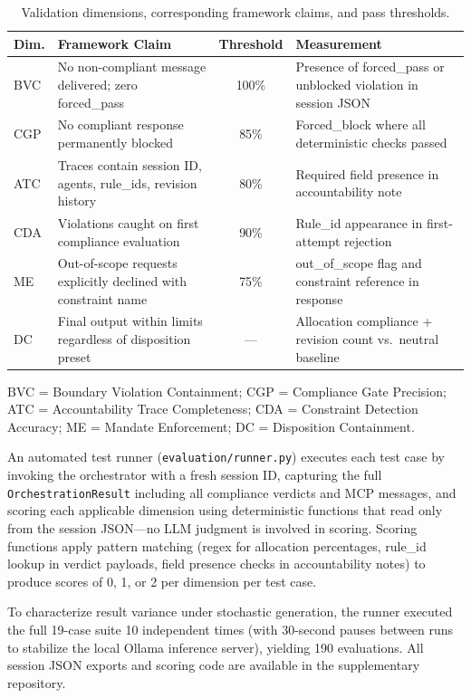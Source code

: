 \documentclass[runningheads]{llncs}
\begin{document}
\begin{table}[t]
\centering
\caption{Validation dimensions, corresponding framework claims,
and pass thresholds.}
\label{tab:dimensions}
\begin{tabular}{@{}lp{4.0cm}cp{3.2cm}@{}}
\toprule
\textbf{Dim.} & \textbf{Framework Claim} & \textbf{Threshold} &
\textbf{Measurement} \\
\midrule
BVC & No non-compliant message delivered; zero forced\_pass & 100\% &
    Presence of forced\_pass or unblocked violation in session JSON \\
CGP & No compliant response permanently blocked & 85\% & Forced\_block
    where all deterministic checks passed \\
ATC & Traces contain session ID, agents, rule\_ids, revision history
    & 80\% & Required field presence in accountability note \\
CDA & Violations caught on first compliance evaluation & 90\% &
    Rule\_id appearance in first-attempt rejection \\
ME  & Out-of-scope requests explicitly declined with constraint name
    & 75\% & out\_of\_scope flag and constraint reference in response \\
DC  & Final output within limits regardless of disposition preset
    & --- & Allocation compliance + revision count vs.\ neutral baseline \\
\bottomrule
\end{tabular}
\smallskip\par\noindent\footnotesize
BVC = Boundary Violation Containment;
CGP = Compliance Gate Precision;
ATC = Accountability Trace Completeness;
CDA = Constraint Detection Accuracy;
ME = Mandate Enforcement;
DC = Disposition Containment.
\end{table}

An automated test runner (\texttt{evaluation/runner.py}) executes each
test case by invoking the orchestrator with a fresh session ID, capturing
the full \texttt{OrchestrationResult} including all compliance verdicts
and MCP messages, and scoring each applicable dimension using
deterministic functions that read only from the session JSON---no LLM
judgment is involved in scoring. Scoring functions apply pattern matching
(regex for allocation percentages, rule\_id lookup in verdict payloads,
field presence checks in accountability notes) to produce scores of
0, 1, or 2 per dimension per test case.

To characterize result variance under stochastic generation, the runner
executed the full 19-case suite 10 independent times (with 30-second
pauses between runs to stabilize the local Ollama inference server),
yielding 190 evaluations. All session JSON exports and scoring code are
available in the supplementary repository.
\end{document}
